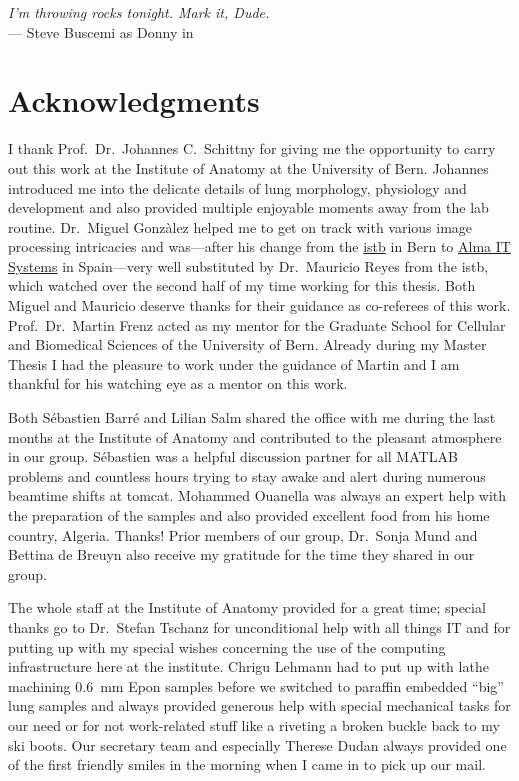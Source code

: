 \acresetall
{}
\begin{flushright}{\slshape I'm throwing rocks tonight. Mark it, Dude.} \\ \medskip
    --- Steve Buscemi as Donny in \citep{TheBigLebowski}
\end{flushright}
\vspace{52mm}

\begingroup
\let\clearpage\relax
\let\cleardoublepage\relax
\let\cleardoublepage\relax
\chapter*{Acknowledgments}
I thank Prof.\ Dr.\ Johannes C.\ Schittny for giving me the opportunity to carry out this work at the Institute of Anatomy at the University of Bern. Johannes introduced me into the delicate details of lung morphology, physiology and development and also provided multiple enjoyable moments away from the lab routine. Dr.\ Miguel Gonzàlez helped me to get on track with various image processing intricacies and was---after his  change from the \href{http://www.istb.unibe.ch/}{\ac{istb}} in Bern to \href{http://www.alma3d.com/en}{Alma IT Systems} in Spain---very well substituted by Dr.\ Mauricio Reyes from the \ac{istb}, which watched over the second half of my time working for this thesis. Both Miguel and Mauricio deserve thanks for their guidance as co-referees of this work. Prof.\ Dr.\ Martin Frenz acted as my mentor for the Graduate School for Cellular and Biomedical Sciences of the University of Bern. Already during my Master Thesis I had the pleasure to work under the guidance of  Martin and I am thankful for his watching eye as a mentor on this work.

Both Sébastien Barré and Lilian Salm shared the office with me during the last months at the Institute of Anatomy and contributed to the pleasant atmosphere in our group. Sébastien was a helpful discussion partner for all MATLAB problems and countless hours trying to stay awake and alert during numerous beamtime shifts at \acs{tomcat}. Mohammed Ouanella was always an expert help with the preparation of the samples and also provided excellent food from his home country, Algeria. Thanks! Prior members of our group, Dr.\ Sonja Mund and Bettina de Breuyn also receive my gratitude for the time they shared in our group.

The whole staff at the Institute of Anatomy provided for a great time; special thanks go to Dr.\ Stefan Tschanz for unconditional help with all things IT and for putting up with my special wishes concerning the use of the computing infrastructure here at the institute. Chrigu Lehmann had to put up with lathe machining \SI{0.6}{\milli\meter} Epon samples before we switched to paraffin embedded ``big'' lung samples and always provided generous help with special mechanical tasks for our need or for not work-related stuff like a riveting a broken buckle back to my ski boots. Our secretary team and especially Therese Dudan always provided one of the first friendly smiles in the morning when I came in to pick up our mail.

